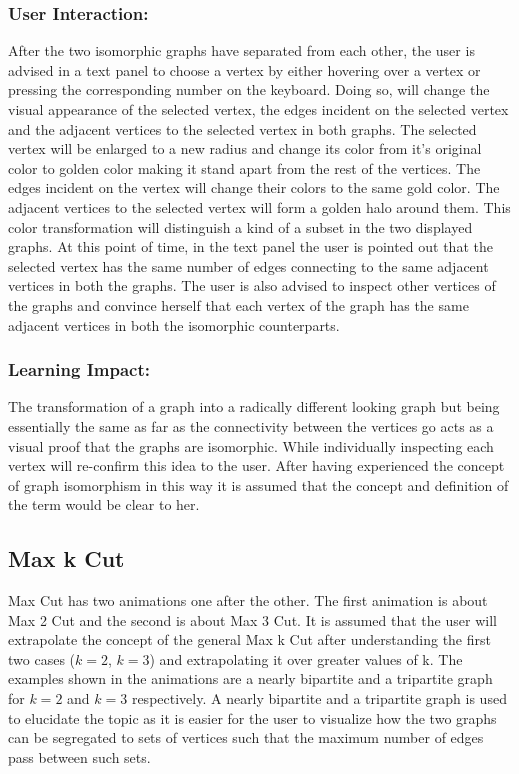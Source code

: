 \subsubsection{User Interaction:}
After the two isomorphic graphs have separated from each other, the user is
advised in a text panel to choose a vertex by either hovering over a vertex or
pressing the corresponding number on the keyboard. Doing so, will change the
visual appearance of the selected vertex, the edges incident on the selected
vertex and the adjacent vertices to the selected vertex in both graphs.  The
selected vertex will be enlarged to a new radius and change its color from it's
original color to golden color making it stand apart from the rest of the
vertices.  The edges incident on the vertex will change their colors to the
same gold color.  The adjacent vertices to the selected vertex will form a
golden halo around them.  This color transformation will distinguish a kind of
a subset in the two displayed graphs. At this point of time, in the text panel
the user is pointed out that the selected vertex has the same number of edges
connecting to the same adjacent vertices in both the graphs.  The user is also
advised to inspect other vertices of the graphs and convince herself that each
vertex of the graph has the same adjacent vertices in both the isomorphic
counterparts.

\subsubsection{Learning Impact:}
The transformation of a graph into a radically different looking graph but
being essentially the same as far as the connectivity between the vertices go
acts as a visual proof that the graphs are isomorphic.  While individually
inspecting each vertex will re-confirm this idea to the user. After having
experienced the concept of graph isomorphism in this way it is assumed that the
concept and definition of the term would be clear to her.


\subsection{Max k Cut}

Max Cut has two animations one after the other.  The first animation is about
Max 2 Cut and the second is about Max 3 Cut.  It is assumed that the user will
extrapolate the concept of the general Max k Cut after understanding the first
two cases ($k=2$, $k=3$) and extrapolating it over greater values of k.  The
examples shown in the animations are a nearly bipartite and a tripartite graph
for $k=2$ and $k=3$ respectively.  A nearly bipartite and a tripartite graph is
used to elucidate the topic as it is easier for the user to visualize how the
two graphs can be segregated to sets of vertices such that the maximum number
of edges pass between such sets.

